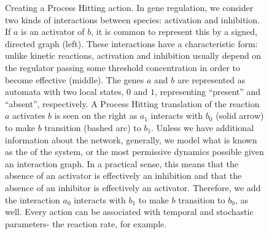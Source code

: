 \documentclass[en]{jdoc}
\begin{document}
   \begin{figure}[h]
\begin{subfigure}[t]{0.3\textwidth}
\end{subfigure}
\begin{subfigure}[b]{0.35\textwidth}
  \end{subfigure}
\begin{subfigure}[b]{0.33\textwidth}
\end{subfigure}

\caption{Creating a Process Hitting action. In gene regulation, we consider two kinds of interactions between species: activation and inhibition. If $a$ is an activator of $b$, it is common to represent this by a signed, directed graph (left). These interactions have a characteristic form: unlike kinetic reactions, activation and inhibition usually depend on the regulator passing some threshold concentration in order to become effective (middle). The genes $a$ and $b$ are represented as automata with two local states, $0$ and $1$, representing ``present'' and ``absent'', respectively. A Process Hitting translation of the reaction $a$ activates $b$ is seen on the right as $a_1$ interacts with $b_0$ (solid arrow) to make $b$ transition (bashed arc) to $b_1$. Unless we have additional information about the network, generally, we model what is known as the  of the system, or the most permissive dynamics possible given an interaction graph. In a practical sense, this means that the absence of an activator is effectively an inhibition and that the absence of an inhibitor is effectively an activator. Therefore, we add the interaction $a_0$ interacts with $b_1$ to make $b$ transition to $b_0$, as well. Every action can be associated with temporal and stochastic parameters- the reaction rate, for example.}
\label{PH_fig}
\end{figure}
\end{document}
